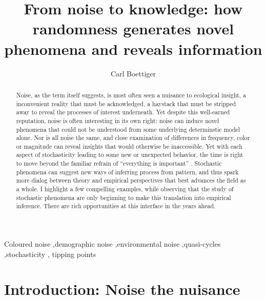 \documentclass[
  authoryear,
  preprint,
  3p]{elsarticle}
\begin{document}
\begin{frontmatter}
\title{From noise to knowledge: how randomness generates novel phenomena
and reveals information}
\author[1]{Carl Boettiger%
%
}



        
\begin{abstract}
Noise, as the term itself suggests, is most often seen a nuisance to
ecological insight, a inconvenient reality that must be acknowledged, a
haystack that must be stripped away to reveal the processes of interest
underneath. Yet despite this well-earned reputation, noise is often
interesting in its own right: noise can induce novel phenomena that
could not be understood from some underlying determinstic model alone.
Nor is all noise the same, and close examination of differences in
frequency, color or magnitude can reveal insights that would otherwise
be inaccessible. Yet with each aspect of stochasticity leading to some
new or unexpected behavior, the time is right to move beyond the
familiar refrain of ``everything is important'' \citep{Bjornstad2001}.
Stochastic phenomena can suggest new ways of inferring process from
pattern, and thus spark more dialog between theory and empirical
perspectives that best advances the field as a whole. I highlight a few
compelling examples, while observing that the study of stochastic
phenomena are only beginning to make this translation into empirical
inference. There are rich opportunities at this interface in the years
ahead.
\end{abstract}





\begin{keyword}
    Coloured noise \sep demographic noise \sep environmental
noise \sep quasi-cycles \sep stochasticity \sep 
    tipping points
\end{keyword}
\end{frontmatter}
    

\section{Introduction: Noise the
nuisance}\label{introduction-noise-the-nuisance}
\end{document}
